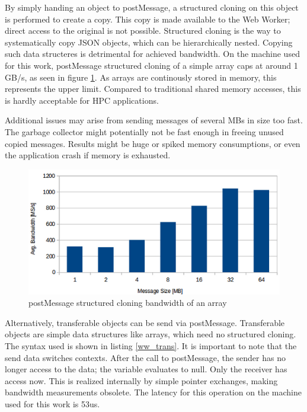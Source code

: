 By simply handing an object to postMessage, a structured cloning on this object is performed to create a copy. This copy is made available to the Web Worker; direct access to the original is not possible. Structured cloning is the way to systematically copy JSON objects, which can be hierarchically nested. Copying such data structeres is detrimental for achieved bandwidth. On the machine used for this work, postMessage structured cloning of a simple array caps at around 1 GB/s, as seen in figure \ref{fig:ww_bw}. As arrays are continously stored in memory, this represents the upper limit. Compared to traditional shared memory accesses, this is hardly acceptable for HPC applications.

Additional issues may arise from sending messages of several MBs in size too fast. The garbage collector might potentially not be fast enough in freeing unused copied messages. Results might be huge or spiked memory consumptions, or even the application crash if memory is exhausted.

\begin{figure}[htp]
  \begin{center}
    \includegraphics[width=0.9\columnwidth]{resources/ww_bw.png}
  \end{center}
  \caption{postMessage structured cloning bandwidth of an array}
  \label{fig:ww_bw}
\end{figure}

Alternatively, transferable objects can be send via postMessage. Transferable objects are simple data structures like arrays, which need no structured cloning. The syntax used is shown in listing \ref{ww_trans}. It is important to note that the send data switches contexts. After the call to postMessage, the sender has no longer access to the data; the variable evaluates to null. Only the receiver has access now. This is realized internally by simple pointer exchanges, making bandwidth measurements obsolete. The latency for this operation on the machine used for this work is 53us.

